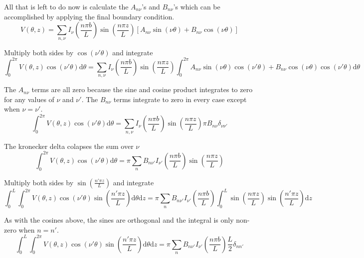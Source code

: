 \documentclass[10pt,a4paper]{article}
\begin{document}
All that is left to do now is calculate the $A_{n\nu}$'s and $B_{n\nu}$'s which can be accomplished by applying the final boundary condition.
\begin{equation}
V(\theta,z)=\sum_{n,\nu}I_\nu\left(\frac{n\pi b}{L}\right)\sin\left(\frac{n\pi z}{L}\right)
\left[A_{n\nu}\sin(\nu\theta)+B_{n\nu}\cos(\nu\theta)\right]
\end{equation}

Multiply both sides by $\cos(\nu'\theta)$ and integrate
\begin{equation}
\int_0^{2\pi}V(\theta,z)\cos(\nu'\theta)\mathrm{d}\theta
=\sum_{n,\nu}I_\nu\left(\frac{n\pi b}{L}\right)\sin\left(\frac{n\pi z}{L}\right)
\int_0^{2\pi}A_{n\nu}\sin(\nu\theta)\cos(\nu'\theta)+B_{n\nu}\cos(\nu\theta)\cos(\nu'\theta)\mathrm{d}\theta
\end{equation}

The $A_{n\nu}$ terms are all zero because the sine and cosine product integrates to zero for any values of $\nu$ and $\nu'$.  The $B_{n\nu}$ terms integrate to zero in every case except when $\nu=\nu'$.
\begin{equation}
\int_0^{2\pi}V(\theta,z)\cos(\nu'\theta)\mathrm{d}\theta
=\sum_{n,\nu}I_\nu\left(\frac{n\pi b}{L}\right)\sin\left(\frac{n\pi z}{L}\right)
\pi B_{n \nu}\delta_{\nu\nu'}
\end{equation}

The kronecker delta colapses the sum over $\nu$
\begin{equation}
\int_0^{2\pi}V(\theta,z)\cos(\nu'\theta)\mathrm{d}\theta =
\pi \sum_nB_{n \nu'}I_{\nu'}\left(\frac{n\pi b}{L}\right)\sin\left(\frac{n\pi z}{L}\right)
\end{equation}

Multiply both sides by $\sin(\frac{n'\pi z}{L})$ and integrate
\begin{equation}
\int_0^L\int_0^{2\pi}V(\theta,z)\cos(\nu'\theta)\sin\left(\frac{n'\pi z}{L}\right)\mathrm{d}\theta \mathrm{d}z =
\pi \sum_n B_{n \nu'}I_{\nu'}\left(\frac{n\pi b}{L}\right)
\int_0^L\sin\left(\frac{n\pi z}{L}\right)\sin\left(\frac{n'\pi z}{L}\right)\mathrm{d}z
\end{equation}

As with the cosines above, the sines are orthogonal and the integral is only non-zero when $n=n'$.
\begin{equation}
\int_0^L\int_0^{2\pi}V(\theta,z)\cos(\nu'\theta)\sin\left(\frac{n'\pi z}{L}\right)\mathrm{d}\theta \mathrm{d}z =
\pi \sum_nB_{n \nu'}I_{\nu'}\left(\frac{n\pi b}{L}\right)
\frac{L}{2}\delta_{nn'}
\end{equation}
\end{document}
